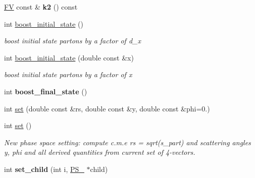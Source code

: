 \begin{DoxyCompactItemize}
\item 
\hypertarget{classPS__2__2_af926b46a1c778aa2e89e6c21ca7fbe1b}{\hyperlink{classFV}{F\-V} const \& {\bfseries k2} () const }\label{classPS__2__2_af926b46a1c778aa2e89e6c21ca7fbe1b}

\item 
\hypertarget{classPS__2__2_a62103a2d987ed8b04918d584e1c7c562}{int \hyperlink{classPS__2__2_a62103a2d987ed8b04918d584e1c7c562}{boost\-\_\-initial\-\_\-state} ()}\label{classPS__2__2_a62103a2d987ed8b04918d584e1c7c562}

\begin{DoxyCompactList}\small\item\em boost initial state partons by a factor of d\-\_\-x \end{DoxyCompactList}\item 
\hypertarget{classPS__2__2_abdf4c563c0c67169a478fb7719581a35}{int \hyperlink{classPS__2__2_abdf4c563c0c67169a478fb7719581a35}{boost\-\_\-initial\-\_\-state} (double const \&x)}\label{classPS__2__2_abdf4c563c0c67169a478fb7719581a35}

\begin{DoxyCompactList}\small\item\em boost initial state partons by a factor of x \end{DoxyCompactList}\item 
\hypertarget{classPS__2__2_a397211db7a5b9781886cc55dae1d23d3}{int {\bfseries boost\-\_\-final\-\_\-state} ()}\label{classPS__2__2_a397211db7a5b9781886cc55dae1d23d3}

\item 
int \hyperlink{classPS__2__2_add28db38c9779539849ecb4384432911}{set} (double const \&rs, double const \&y, double const \&phi=0.)
\item 
\hypertarget{classPS__2__2_a078daa6a7f7bf3d9b94884ea4637888a}{int \hyperlink{classPS__2__2_a078daa6a7f7bf3d9b94884ea4637888a}{set} ()}\label{classPS__2__2_a078daa6a7f7bf3d9b94884ea4637888a}

\begin{DoxyCompactList}\small\item\em New phase space setting\-: compute c.\-m.\-e rs = sqrt(s\-\_\-part) and scattering angles y, phi and all derived quantities from current set of 4-\/vectors. \end{DoxyCompactList}\item 
\hypertarget{classPS__2__2_a7ed4acdee85fea6b129aa9801cb8d3c7}{int {\bfseries set\-\_\-child} (int i, \hyperlink{classPS__2}{P\-S\-\_} $\ast$child)}\label{classPS__2__2_a7ed4acdee85fea6b129aa9801cb8d3c7}


\end{DoxyCompactItemize}
